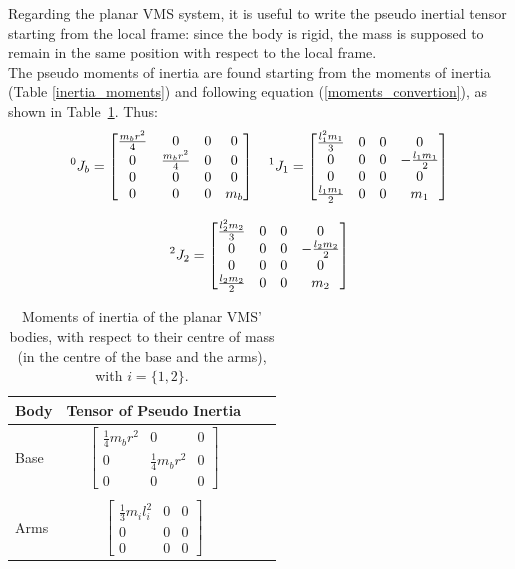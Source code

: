 \documentclass[a4paper,12pt,oneside]{report}
\begin{document}
Regarding the planar VMS system, it is useful to write the pseudo inertial tensor starting from the local frame: since the body is rigid, the mass is supposed to remain in the same position with respect to the local frame.\\
The pseudo moments of inertia are found starting from the moments of inertia (Table \ref{inertia_moments}) and following equation (\ref{moments_convertion}), as shown in Table~\ref{pseudo_moments_table}. Thus:
\begin{equation}
  \begin{array}{c}
  \prescript{0}{}{J_b}=\begin{bmatrix}
    \frac{m_br^2}{4}&0&0&0\\
    0&\frac{m_br^2}{4}&0&0\\
    0&0&0&0\\
    0&0&0&m_b
  \end{bmatrix} \quad
    \prescript{1}{}{J_1}=\begin{bmatrix}
    \frac{l_1^2m_1}{3}&0&0&0\\
    0&0&0&-\frac{l_1m_1}{2}\\
    0&0&0&0\\
    \frac{l_1m_1}{2}&0&0&m_1
  \end{bmatrix}\\
  \\
  \prescript{2}{}{J_2}=\begin{bmatrix}
    \frac{l_2^2m_2}{3}&0&0&0\\
    0&0&0&-\frac{l_2m_2}{2}\\
    0&0&0&0\\
    \frac{l_2m_2}{2}&0&0&m_2
  \end{bmatrix}
  \end{array}
\end{equation}
\begin{table}
  \caption{Moments of inertia of the planar VMS' bodies, with respect to their centre of mass (in the centre of the base and the arms), with $i=\{1,2\}$.}
  \label{pseudo_moments_table}
  \begin{center}
  \begin{tabular}{lccc}
    \toprule
  \textbf{Body} & \textbf{Tensor of Pseudo Inertia}\\
  \midrule
  Base&$\begin{bmatrix}
    \frac{1}{4}m_br^2&0&0\\
    0&\frac{1}{4}m_br^2&0\\
    0&0&0
  \end{bmatrix}$\\
  \\
  Arms&$\begin{bmatrix}
    \frac{1}{3}m_il_i^2&0&0\\
    0&0&0\\
    0&0&0
  \end{bmatrix}$\\
  \bottomrule
  \end{tabular}
  \end{center}
  \end{table}
\end{document}
